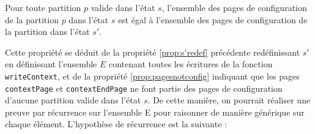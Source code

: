 			\begin{property}
				\label{prop:sameconfigpages}
				Pour toute partition $p$ valide dans l'état $s$, l'ensemble des pages de configuration de la partition $p$ dans l'état $s$ est égal à l'ensemble des pages de configuration de la partition dans l'état $s'$.
			\end{property}

			Cette propriété se déduit de la propriété \ref{prop:s'redef} précédente redéfinissant $s'$ en définissant l'ensemble $E$ contenant toutes les écritures de la fonction \texttt{writeContext}, et de la propriété \ref{prop:pagesnotconfig} indiquant que les pages \texttt{contextPage} et \texttt{contextEndPage} ne font partie des pages de configuration d'aucune partition valide dans l'état $s$.
			De cette manière, on pourrait réaliser une preuve par récurrence sur l'ensemble E pour raisonner de manière générique sur chaque élément. L'hypothèse de récurrence est la suivante :

